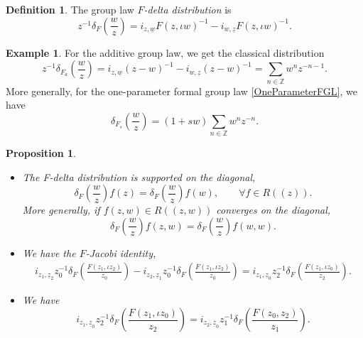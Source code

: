 \documentclass[10pt,a4paper]{amsart}
\numberwithin{equation}{section}
\newtheorem{Proposition}[Theorem]{Proposition}
\theoremstyle{definition}
\newtheorem{Definition}[Theorem]{Definition}
\newtheorem{Example}[Theorem]{Example}
\begin{document}

\begin{Definition}
 The group law \emph{$F$-delta distribution} is
 \[
 z^{-1}\delta_F\left(\frac{w}{z}\right) = i_{z,\underline w}F(z,\iota w)^{-1}-i_{w,\underline z}F(z,\iota w)^{-1}.
 \]
\end{Definition}

\begin{Example}
For the additive group law, we get the classical distribution
\begin{equation}
\label{ClassicalDelta}
 z^{-1}\delta_{F_a}\left(\frac{w}{z}\right)=i_{z,\underline w}(z-w)^{-1}-i_{w,\underline z}(z-w)^{-1}=\sum_{n\in\mathbb{Z}} w^nz^{-n-1}.
\end{equation}
More generally, for the one-parameter formal group law \eqref{OneParameterFGL}, we have
\[
 \delta_{F_s}\left(\frac{w}{z}\right)=(1+sw)\sum_{n\in\mathbb{Z}} w^nz^{-n}.
\]
\end{Example}

\begin{Proposition}\quad
\label{PropJacobiDelta}
\begin{itemize}\itemsep=0pt
\item[$(a)$]
 The F-delta distribution is supported on the diagonal,
 \begin{equation}
 \label{DiagonalSupport}
 \delta_F\left(\frac{w}{z}\right)f(z)=\delta_F\left(\frac{w}{z}\right)f(w),\qquad\forall f\in R(\!( z)\!).
 \end{equation}
 More generally, if $f(z,w)\in R(\!( z,w)\!)$ converges on the diagonal,
 \begin{equation}
 \label{DiagonalSupport2}
 \delta_F\left(\frac{w}{z}\right)f(z,w)=\delta_F\left(\frac{w}{z}\right)f(w,w).
 \end{equation}
 \item[$(2)$]
 We have the \emph{$F$-Jacobi identity},
 \begin{gather*}
 i_{z_1,\underline z_2}z_0^{-1}\delta_F\left(\frac{F(z_1,\iota z_2)}{z_0}\right)
 -i_{z_2,\underline z_1}z_0^{-1}\delta_F\left(\frac{F(z_1,\iota z_2)}{z_0}\right)
 =i_{z_1,\underline z_0}z_2^{-1}\delta_F\left(\frac{F(z_1,\iota z_0)}{z_2}\right).
 \end{gather*}
 \item[$(3)$]
 We have
 \[
 i_{z_1,\underline z_0}z_2^{-1}\delta_F\left(\frac{F(z_1,\iota z_0)}{z_2}\right)
 =i_{z_2,\underline z_0}z_1^{-1}\delta_F\left(\frac{F(z_0,z_2)}{z_1}\right).
 \]
 \end{itemize}
\end{Proposition}
\end{document}
